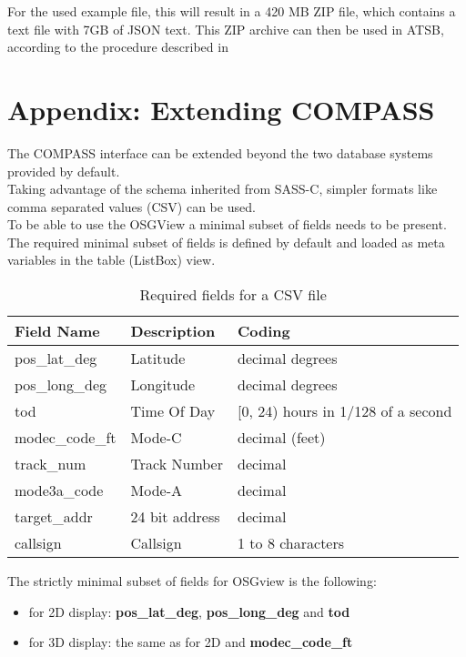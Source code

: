 For the used example file, this will result in a 420 MB ZIP file, which contains a text file with 7GB of JSON text. This ZIP archive can then be used in ATSB, according to the procedure described in 

\section{Appendix: Extending COMPASS}
\label{sec:extending_compass}

The COMPASS interface can be extended beyond the two database systems provided by default. \\

Taking advantage of the schema inherited from SASS-C, simpler formats like comma separated values (CSV) can be used. \\

To be able to use the OSGView a minimal subset of fields needs to be present. The required minimal subset of fields is defined by default and loaded as meta variables in the table (ListBox) view. \\

\begin{table}[H]
  \center
  \begin{tabular}{ | l | l | l |}
    \hline
    \textbf{Field Name} & \textbf{Description} & \textbf{Coding} \\ \hline
    pos\_lat\_deg & Latitude & decimal degrees \\ \hline
    pos\_long\_deg & Longitude & decimal degrees \\ \hline
    tod & Time Of Day & [0, 24) hours in 1/128 of a second \\ \hline
    modec\_code\_ft & Mode-C & decimal (feet) \\ \hline
    track\_num & Track Number & decimal \\ \hline
    mode3a\_code & Mode-A & decimal \\ \hline
    target\_addr & 24 bit address & decimal \\ \hline
    callsign & Callsign & 1 to 8 characters \\ \hline
  \end{tabular}
  \caption{Required fields for a CSV file}
\end{table}

The strictly minimal subset of fields for OSGview is the following:
\begin{itemize}
\item for 2D display: \textbf{pos\_lat\_deg}, \textbf{pos\_long\_deg} and \textbf{tod}
\item for 3D display: the same as for 2D and \textbf{modec\_code\_ft}
\\
\end{itemize}

